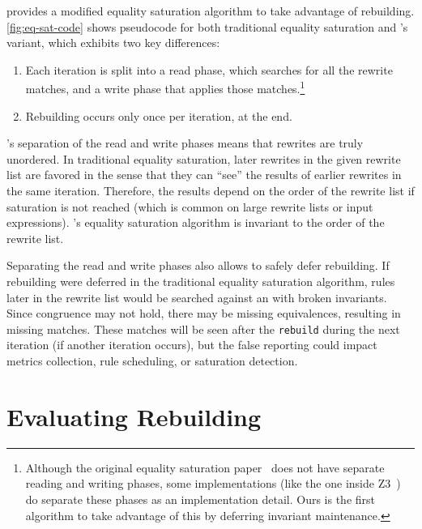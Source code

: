 \egg provides a modified equality saturation algorithm to take advantage
  of rebuilding.
\autoref{fig:eq-sat-code} shows pseudocode for both traditional equality
  saturation and \egg's variant, which exhibits two key differences:
\begin{enumerate}
  \item Each iteration is split into a read phase, which searches for all the
        rewrite matches, and a write phase that applies those matches.\footnote
    {
      Although the original equality saturation paper~\cite{eqsat}
      does not have separate reading and writing phases,
      some \egraph implementations (like the one inside Z3~\cite{z3})
      do separate these phases as an implementation detail.
      Ours is the first algorithm to take advantage of this by deferring
      invariant maintenance.
    }
  \item Rebuilding occurs only once per iteration, at the end.
\end{enumerate}

\egg's separation of the read and write phases means that rewrites are truly
  unordered.
In traditional equality saturation, later rewrites in the given rewrite list are
  favored in the sense that they can ``see'' the results of earlier rewrites in
  the same iteration.
Therefore, the results depend on the order of the rewrite list
  if saturation is not reached (which is common on large rewrite lists or input
  expressions).
\egg's equality saturation algorithm is invariant to the order of the rewrite
  list.

Separating the read and write phases also allows \egg to safely defer rebuilding.
If rebuilding were deferred in the traditional equality saturation algorithm,
  rules later in the rewrite list would be searched against an \egraph with
  broken invariants.
Since congruence may not hold, there may be missing equivalences, resulting in
  missing matches.
These matches will be seen after the \texttt{rebuild} during the next iteration
  (if another iteration occurs), but the false reporting could impact metrics
  collection, rule scheduling,\footnotemark{} or saturation detection.

\section{Evaluating Rebuilding}
\label{sec:rebuild-eval}

